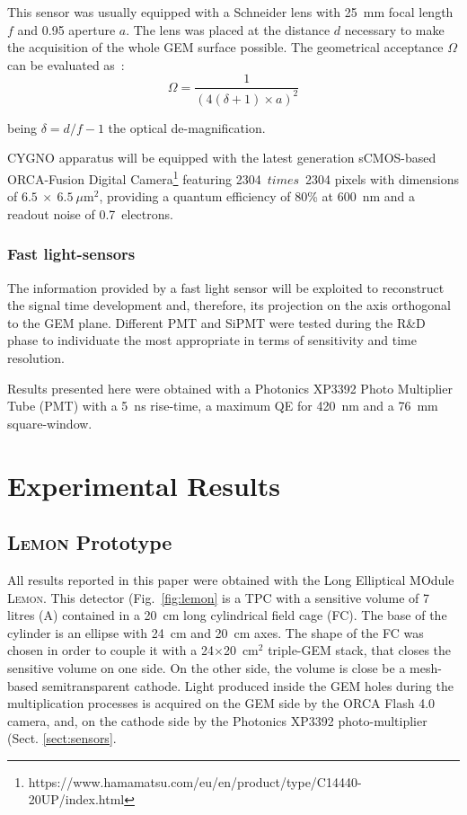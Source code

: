 \documentclass[review]{elsarticle}
\newcommand{\lemon}{{\textsc{Lemon}}\xspace}
\begin{document}
 This sensor was usually equipped with a Schneider lens with 25~mm focal length $f$ and 0.95 aperture $a$. The lens was placed at the distance $d$ necessary to make the acquisition of the whole GEM surface possible. 
 The geometrical acceptance $\Omega$ can be evaluated as~\cite{bib:ieee_orange}:
$$
 \Omega = \frac{1}{\left(4(\delta+1)\times a \right)^2}
$$

being $\delta = d/f - 1$ the optical de-magnification.

CYGNO apparatus will be equipped with the latest generation sCMOS-based ORCA-Fusion Digital Camera\footnote{https://www.hamamatsu.com/eu/en/product/type/C14440-20UP/index.html} featuring 2304~$times$~2304 pixels with dimensions of $6.5~\times~6.5~\mu$m$^2$, providing a quantum efficiency of 80\% at 600~nm and a readout noise of 0.7~electrons.

\subsubsection{Fast light-sensors}

The information provided by a fast light sensor will be exploited to reconstruct the signal time development and, therefore, its projection on the axis orthogonal to the GEM plane. Different PMT and SiPMT were tested during the R&D phase to individuate the most appropriate in terms of sensitivity and time resolution.

Results presented here were obtained with a
Photonics XP3392 Photo Multiplier Tube (PMT) with a 5~ns rise-time, a maximum QE for 420~nm and a 76~mm square-window.


\section{Experimental Results}
\subsection{\lemon Prototype}
All results reported in this paper were obtained with the Long Elliptical MOdule \lemon. This detector (Fig.~\ref{fig:lemon} is a TPC with a sensitive volume of 7 litres (A) contained in a 20~cm long cylindrical field cage (FC). The base of the cylinder is an ellipse with 24~cm and 20~cm axes. The shape of the FC was chosen in order to couple it with a 24$\times$20~cm$^2$ triple-GEM stack, that closes the sensitive volume on  one side. On the other side, the volume is close be a mesh-based semitransparent cathode. Light produced inside the GEM holes during the multiplication processes is acquired on the GEM side by the ORCA Flash 4.0 camera, and, on the cathode side by the Photonics XP3392 photo-multiplier (Sect. \ref{sect:sensors}.
\end{document}
